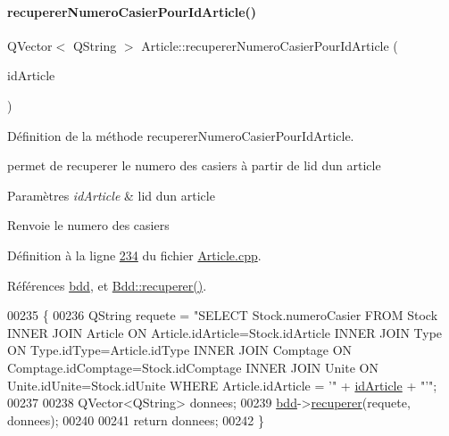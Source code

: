 \paragraph{\texorpdfstring{recuperer\+Numero\+Casier\+Pour\+Id\+Article()}{recupererNumeroCasierPourIdArticle()}}
{\footnotesize\ttfamily Q\+Vector$<$ Q\+String $>$ Article\+::recuperer\+Numero\+Casier\+Pour\+Id\+Article (\begin{DoxyParamCaption}\item[{Q\+String}]{id\+Article }\end{DoxyParamCaption})\hspace{0.3cm}{\ttfamily [static]}}



Définition de la méthode recuperer\+Numero\+Casier\+Pour\+Id\+Article. 

permet de recuperer le numero des casiers à partir de l\textquotesingle{}id d\textquotesingle{}un article 
\begin{DoxyParams}{Paramètres}
{\em id\+Article} & l\textquotesingle{}id d\textquotesingle{}un article \\
\hline
\end{DoxyParams}
\begin{DoxyReturn}{Renvoie}
le numero des casiers 
\end{DoxyReturn}


Définition à la ligne \hyperlink{_article_8cpp_source_l00234}{234} du fichier \hyperlink{_article_8cpp_source}{Article.\+cpp}.



Références \hyperlink{_article_8h_source_l00082}{bdd}, et \hyperlink{_bdd_8cpp_source_l00187}{Bdd\+::recuperer()}.


\begin{DoxyCode}
00235 \{
00236     QString requete = \textcolor{stringliteral}{"SELECT Stock.numeroCasier FROM Stock INNER JOIN Article ON
       Article.idArticle=Stock.idArticle INNER JOIN Type ON Type.idType=Article.idType INNER JOIN Comptage ON
       Comptage.idComptage=Stock.idComptage INNER JOIN Unite ON Unite.idUnite=Stock.idUnite WHERE Article.idArticle = '"} + 
      \hyperlink{class_article_a9f2f7a04139f26accec145066a5aacae}{idArticle} + \textcolor{stringliteral}{"'"};
00237 
00238     QVector<QString> donnees;
00239     \hyperlink{class_article_a7221cec4212d86d74f479b9ee683ee8a}{bdd}->\hyperlink{class_bdd_a8f25d29d309041bbf875700db0efd97b}{recuperer}(requete, donnees);
00240 
00241     \textcolor{keywordflow}{return} donnees;
00242 \}
\end{DoxyCode}
\mbox{\label{class_article_aa311f3d149340622383c418444aa65a4}} 

